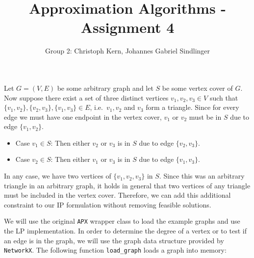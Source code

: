 \documentclass{article}
\title{Approximation Algorithms - Assignment 4}
\author{Group 2: Christoph Kern, Johannes Gabriel Sindlinger}
\begin{document}
\maketitle

\noindent{}
\vspace{1em}

Let $G=(V,E)$ be some arbitrary graph and let $S$ be some vertex cover of $G$. Now suppose there exist a set of three distinct vertices $v_1, v_2, v_3 \in V$ such that $\{v_1, v_2\}, \{v_2, v_3\}, \{v_1, v_3\} \in E$, i.e.~$v_1, v_2$ and $v_3$ form a triangle. Since for every edge we must have one endpoint in the vertex cover, $v_1$ or $v_2$ must be in $S$ due to edge $\{v_1, v_2\}$.
\begin{itemize}
    \item Case $v_1 \in S$: Then either $v_2$ or $v_3$ is in $S$ due to edge $\{v_2, v_3\}$. 
    \item Case $v_2 \in S$: Then either $v_1$ or $v_3$ is in $S$ due to edge $\{v_1, v_3\}$. 
\end{itemize}

In any case, we have two vertices of $\{v_1, v_2, v_3\}$ in $S$. Since this was an arbitrary triangle in an arbitrary graph, it holds in general that two vertices of any triangle must be included in the vertex cover. Therefore, we can add this additional constraint to our IP formulation without removing feasible solutions.
\vspace{2.5em}

\noindent{}
\vspace{1em}

We will use the original \lstinline|APX| wrapper class to load the example graphs and use the LP implementation. In order to determine the degree of a vertex or to test if an edge is in the graph, we will use the graph data structure provided by \lstinline|NetworkX|. The following function \lstinline|load_graph| loads a graph into memory:
\end{document}
